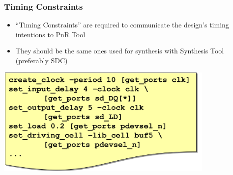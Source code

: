 \documentclass[compress]{beamer}
\begin{document}
\begin{frame}
	\frametitle{Timing Constraints}
	\begin{itemize}
		\item “Timing Constraints” are required to communicate the design’s timing intentions to PnR Tool
		\item They should be the same ones used for synthesis with Synthesis Tool (preferably SDC)
	\end{itemize}
	\begin{center}
		\includegraphics[width=0.8\textwidth]{SDC}
	\end{center}
\end{frame}	
\end{document}
